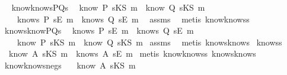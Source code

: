 \begin{isabellebody}
\endisatagproof
{\isafoldproof}%
%
\isadelimproof
\ \isanewline
%
\endisadelimproof
\isanewline
{}\isamarkupfalse%
\ know{}knowsPQ{\isacharunderscore}s{\isacharcolon}\ \isanewline
{}\ {\isachardoublequoteopen}know\ P\ {\isacharparenleft}sKS\ m{\isacharparenright}\ {\isasymor}\ know\ Q\ {\isacharparenleft}sKS\ m{\isacharparenright}{\isachardoublequoteclose}\isanewline
{}\ \ \ \ {\isachardoublequoteopen}knows\ P\ {\isacharbrackleft}sE\ m{\isacharbrackright}\ {\isasymor}\ knows\ Q\ {\isacharbrackleft}sE\ m{\isacharbrackright}{\isachardoublequoteclose}\ \isanewline
%
\isadelimproof
%
\endisadelimproof
%
\isatagproof
{}\isamarkupfalse%
\ assms\ \isamarkupfalse%
\ {\isacharparenleft}metis\ know{}knows{\isacharunderscore}s{\isacharparenright}%
\endisatagproof
{\isafoldproof}%
%
\isadelimproof
\isanewline
%
\endisadelimproof
\isanewline
{}\isamarkupfalse%
\ knows{}knowPQ{\isacharunderscore}s{\isacharcolon}\ \isanewline
{}\ {\isachardoublequoteopen}knows\ P\ {\isacharbrackleft}sE\ m{\isacharbrackright}\ {\isasymor}\ knows\ Q\ {\isacharbrackleft}sE\ m{\isacharbrackright}{\isachardoublequoteclose}\isanewline
{}\ \ \ \ {\isachardoublequoteopen}know\ P\ {\isacharparenleft}sKS\ m{\isacharparenright}\ {\isasymor}\ know\ Q\ {\isacharparenleft}sKS\ m{\isacharparenright}{\isachardoublequoteclose}\isanewline
%
\isadelimproof
%
\endisadelimproof
%
\isatagproof
{}\isamarkupfalse%
\ assms\ \isamarkupfalse%
\ {\isacharparenleft}metis\ knows{}know{\isacharunderscore}s{\isacharparenright}%
\endisatagproof
{\isafoldproof}%
%
\isadelimproof
\isanewline
%
\endisadelimproof
\isanewline
{}\isamarkupfalse%
\ knows{}s{\isacharcolon}\isanewline
\ \ {\isachardoublequoteopen}know\ A\ {\isacharparenleft}sKS\ m{\isacharparenright}\ {\isacharequal}\ knows\ A\ {\isacharbrackleft}sE\ m{\isacharbrackright}{\isachardoublequoteclose}\isanewline
%
\isadelimproof
%
\endisadelimproof
%
\isatagproof
{}\isamarkupfalse%
\ {\isacharparenleft}metis\ know{}knows{\isacharunderscore}s\ knows{}know{\isacharunderscore}s{\isacharparenright}%
\endisatagproof
{\isafoldproof}%
%
\isadelimproof
\ \isanewline
%
\endisadelimproof
\isanewline
{}\isamarkupfalse%
\ know{}knows{\isacharunderscore}neg{\isacharunderscore}s{\isacharcolon}\ \isanewline
{}\ {\isachardoublequoteopen}{\isasymnot}\ know\ A\ {\isacharparenleft}sKS\ m{\isacharparenright}{\isachardoublequoteclose}\isanewline

\end{isabellebody}
